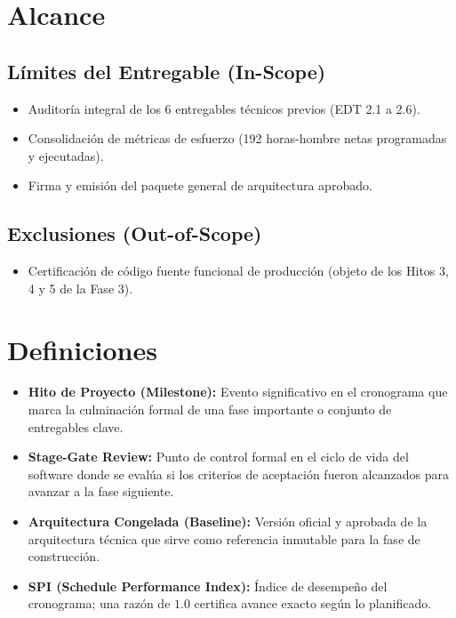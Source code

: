 \documentclass[12pt,a4paper]{article}
\begin{document}
\section{Alcance}
\subsection{Límites del Entregable (In-Scope)}
\begin{itemize}[leftmargin=1.5em, itemsep=2pt]
    \item Auditoría integral de los 6 entregables técnicos previos (EDT 2.1 a 2.6).
    \item Consolidación de métricas de esfuerzo (192 horas-hombre netas programadas y ejecutadas).
    \item Firma y emisión del paquete general de arquitectura aprobado.
\end{itemize}
\subsection{Exclusiones (Out-of-Scope)}
\begin{itemize}[leftmargin=1.5em, itemsep=2pt]
    \item Certificación de código fuente funcional de producción (objeto de los Hitos 3, 4 y 5 de la Fase 3).
\end{itemize}

\section{Definiciones}
\begin{itemize}[leftmargin=1.5em, itemsep=2pt]
    \item \textbf{Hito de Proyecto (Milestone):} Evento significativo en el cronograma que marca la culminación formal de una fase importante o conjunto de entregables clave.
    \item \textbf{Stage-Gate Review:} Punto de control formal en el ciclo de vida del software donde se evalúa si los criterios de aceptación fueron alcanzados para avanzar a la fase siguiente.
    \item \textbf{Arquitectura Congelada (Baseline):} Versión oficial y aprobada de la arquitectura técnica que sirve como referencia inmutable para la fase de construcción.
    \item \textbf{SPI (Schedule Performance Index):} Índice de desempeño del cronograma; una razón de $1.0$ certifica avance exacto según lo planificado.
\end{itemize}
\end{document}
